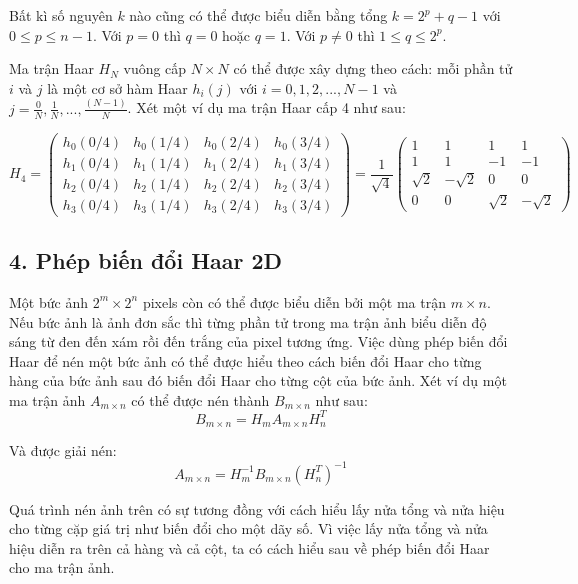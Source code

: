 \noindent Bất kì số nguyên $k$ nào cũng có thể được biểu diễn bằng tổng $k=2^p+q-1$ với $0 \le p \le n-1$. Với $p=0$ thì $q=0$ hoặc $q=1$.
Với $p \ne 0$ thì $1 \le q \le 2^p$.

Ma trận Haar $H_N$ vuông cấp $N \times N$ có thể được xây dựng theo cách: mỗi phần tử $i$ và $j$ là một cơ sở hàm Haar $h_i(j)$ với $i=0,1,2,...,N-1$
và $j=\frac{0}{N},\frac{1}{N},...,\frac{(N-1)}N{}$. Xét một ví dụ ma trận Haar cấp 4 như sau:
\begin{center}
    $$H_4 = \begin{pmatrix}
        h_0(0/4) & h_0(1/4) & h_0(2/4) & h_0(3/4) \\
        h_1(0/4) & h_1(1/4) & h_1(2/4) & h_1(3/4) \\
        h_2(0/4) & h_2(1/4) & h_2(2/4) & h_2(3/4) \\
        h_3(0/4) & h_3(1/4) & h_3(2/4) & h_3(3/4)
    \end{pmatrix} = 
    \frac{1}{\sqrt{4}} \begin{pmatrix}
        1 & 1 & 1 & 1 \\
        1 & 1 & -1 & -1 \\
        \sqrt{2} & -\sqrt{2} & 0 & 0 \\
        0 & 0 & \sqrt{2} & -\sqrt{2}
    \end{pmatrix}$$
\end{center}

\subsection*{4. Phép biến đổi Haar 2D}
Một bức ảnh $2^m \times 2^n$ pixels còn có thể được biểu diễn bởi một ma trận $m \times n$. Nếu bức ảnh là ảnh đơn sắc thì từng phần tử trong ma trận ảnh
biểu diễn độ sáng từ đen đến xám rồi đến trắng của pixel tương ứng. Việc dùng phép biến đổi Haar để nén một bức ảnh có thể được hiểu theo cách 
biến đổi Haar cho từng hàng của bức ảnh sau đó biến đổi Haar cho từng cột của bức ảnh. Xét ví dụ một ma trận ảnh $A_{m \times n}$ có thể được nén thành $B_{m \times n}$ như sau:
$$B_{m \times n} = H_mA_{m \times n}H_n^T$$

\noindent Và được giải nén: $$A_{m \times n} = H_m^{-1}B_{m \times n}(H_n^T)^{-1}$$

Quá trình nén ảnh trên có sự tương đồng với cách hiểu lấy nửa tổng và nửa hiệu cho từng cặp giá trị như biến đổi cho một dãy số. 
Vì việc lấy nửa tổng và nửa hiệu diễn ra trên cả hàng và cả cột, ta có cách hiểu sau về phép biến đổi Haar cho ma trận ảnh. 

